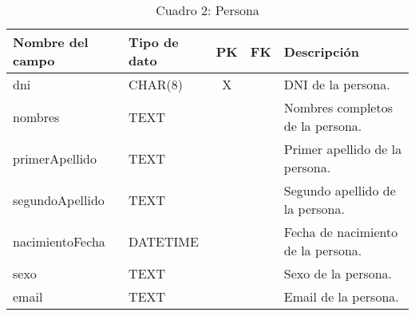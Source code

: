 \begin{table}[H]
	\centering
	\begin{tabular}{|l|l|c|c|l|}
		\hline
		\textbf{Nombre del campo} & \textbf{Tipo de dato} & \textbf{PK} & \textbf{FK} & \textbf{Descripción}               \\
		\hline
		dni                       & CHAR(8)               & X           &             & DNI de la persona.                 \\
		\hline
		nombres                   & TEXT                  &             &             & Nombres completos de la persona.   \\
		\hline
		primerApellido            & TEXT                  &             &             & Primer apellido de la persona.     \\
		\hline
		segundoApellido           & TEXT                  &             &             & Segundo apellido de la persona.    \\
		\hline
		nacimientoFecha           & DATETIME              &             &             & Fecha de nacimiento de la persona. \\
		\hline
		sexo                      & TEXT                  &             &             & Sexo de la persona.                \\
		\hline
		email                     & TEXT                  &             &             & Email de la persona.               \\
		\hline
	\end{tabular}
	\caption{Cuadro 2: Persona}
\end{table}